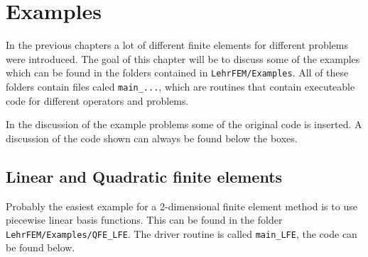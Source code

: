 %
%

\chapter{Examples}

In the previous chapters a lot of different finite elements for different problems were introduced. The goal of this chapter will be to discuss some of the examples which can be found in the folders contained in \texttt{LehrFEM/Examples}. All of these folders contain files caled \texttt{main\_...}, which are routines that contain executeable code for different operators and problems.

In the discussion of the example problems some of the original code is inserted. A discussion of the code shown can always be found below the boxes.


\section{Linear and Quadratic finite elements} \label{sec:lqfe}

Probably the easiest example for a 2-dimensional finite element method is to use piecewise linear basis functions. This can be found in the folder \texttt{LehrFEM/Examples/QFE\_LFE}. The driver routine is called \texttt{main\_LFE}, the code can be found below.

